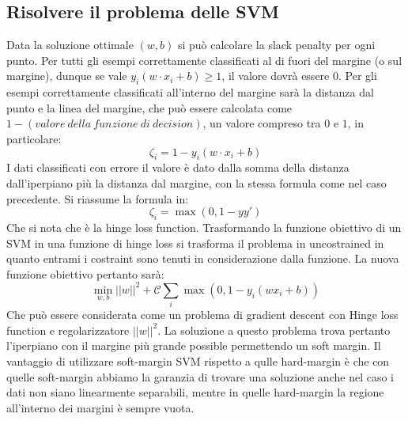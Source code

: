 	\subsection{Risolvere il problema delle SVM}
	Data la soluzione ottimale $(w,b)$ si pu\`o calcolare la slack penalty per ogni punto.
	Per tutti gli esempi correttamente classificati al di fuori del margine (o sul margine), dunque se vale $y_i(w \cdot x_i+b) \ge 1$, il valore dovr\`a essere $0$.
	Per gli esempi correttamente classificati all'interno del margine sar\`a la distanza dal punto e la linea del margine, che pu\`o essere calcolata come $1-(valore\ della\ funzione\ di\ decision)$, un valore compreso tra $0$ e $1$, in particolare:
	$$\zeta_i = 1 - y_i(w \cdot x_i+b)$$
	I dati classificati con errore il valore \`e dato dalla somma della distanza dall'iperpiano pi\`u la distanza dal margine, con la stessa formula come nel caso precedente.
	Si riassume la formula in:
	$$\zeta_i = \max(0,1-yy')$$	
	Che si nota che \`e la hinge loss function.
	Trasformando la funzione obiettivo di un SVM in una funzione di hinge loss si trasforma il problema in uncostrained in quanto entrami i costraint sono tenuti in considerazione dalla funzione.
	La nuova funzione obiettivo pertanto sar\`a:
	$$\min_{w,b}||w||^2+\mathcal{C}\sum_i\max(0,1-y_i(wx_i+b))$$
	Che pu\`o essere considerata come un problema di gradient descent con Hinge loss function e regolarizzatore $||w||^2$.
	La soluzione a questo problema trova pertanto l'iperpiano con il margine pi\`u grande possible permettendo un soft margin. Il vantaggio di utilizzare soft-margin SVM rispetto a qulle hard-margin \`e che con quelle soft-margin abbiamo la garanzia di trovare una soluzione anche nel caso i dati non siano linearmente separabili, mentre in quelle hard-margin la regione all'interno dei margini \`e sempre vuota.

